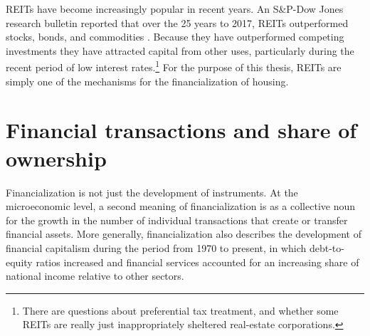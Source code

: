 REITs have become increasingly popular in recent years.  An S\&P-Dow Jones research bulletin reported that over the  25 years to 2017, REITs outperformed stocks, bonds, and commodities \cite{GET-Dow-Jones-research-bulletin}. %
Because they have outperformed competing investments they have attracted  capital from other uses, particularly during the recent period of low interest rates.\footnote{There are questions about preferential tax treatment, and whether some REITs are really just inappropriately sheltered real-estate corporations. } For the purpose of this thesis, REITs are simply one of the mechanisms for the financialization of housing.

\section{Financial transactions and share of ownership}

Financialization is not just the development of instruments. 
At the microeconomic level,  a second meaning of financialization is as a collective noun for the growth in the number of individual transactions that create or transfer financial assets. 
More generally, financialization also describes the development of financial capitalism during the period from 1970 to present, in which debt-to-equity ratios increased and financial services accounted for an increasing share of national income relative to other sectors. %

